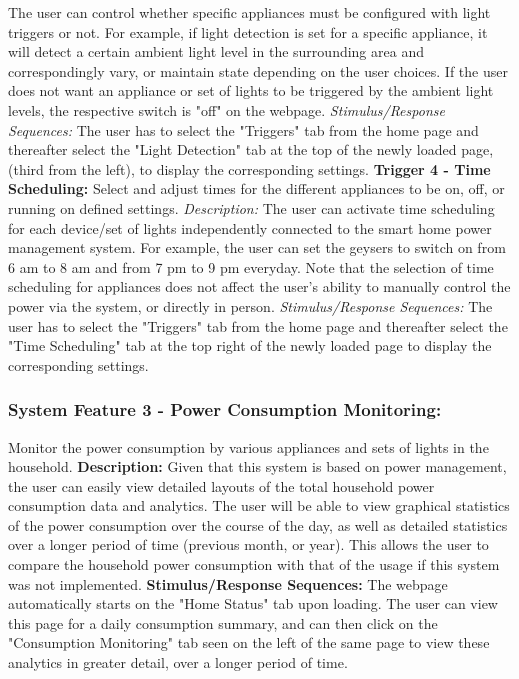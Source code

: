 \documentclass[10pt,twocolumn]{witseiepaper}
\begin{document}
	The user can control whether specific appliances must be configured with light triggers or not. For example, if light detection is set for a specific appliance, it will detect a certain ambient light level in the surrounding area and correspondingly vary, or maintain state depending on the user choices. If the user does not want an appliance or set of lights to be triggered by the ambient light levels, the respective switch is "off" on the webpage. 
	\newline
	\textit{Stimulus/Response Sequences:}
	The user has to select the "Triggers" tab from the home page and thereafter select the "Light Detection" tab at the top of the newly loaded page, (third from the left), to display the corresponding settings.
	\newline
	\textbf{Trigger 4 - Time Scheduling:}
	Select and adjust times for the different appliances to be on, off, or running on defined settings. 
	\newline
	\textit{Description:}
	The user can activate time scheduling for each device/set of lights independently connected to the smart home power management system. For example, the user can set the geysers to switch on from 6 am to 8 am and from 7 pm to 9 pm everyday. Note that the selection of time scheduling for appliances does not affect the user's ability to manually control the power via the system, or directly in person. 
	\newline
	\textit{Stimulus/Response Sequences:}
	The user has to select the "Triggers" tab from the home page and thereafter select the "Time Scheduling" tab at the top right of the newly loaded page to display the corresponding settings.
	\subsubsection{System Feature 3 - Power Consumption Monitoring:}
	Monitor the power consumption by various appliances and sets of lights in the household. 
	\newline
	\textbf{Description:}
	Given that this system is based on power management, the user can easily view detailed layouts of the total household power consumption data and analytics. The user will be able to view graphical statistics of the power consumption over the course of the day, as well as detailed statistics over a longer period of time (previous month, or year). This allows the user to compare the household power consumption with that of the usage if this system was not implemented. 
	\newline
	\textbf{Stimulus/Response Sequences:}
	The webpage automatically starts on the "Home Status" tab upon loading. The user can view this page for a daily consumption summary, and can then click on the "Consumption Monitoring" tab seen on the left of the same page to view these analytics in greater detail, over a longer period of time.
\end{document}
